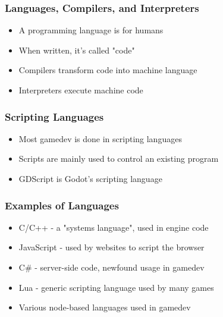 \documentclass{beamer}
\newenvironment{xframe}[2][]
{
    \begin{frame}[fragile,environment=xframe,#1]
    \frametitle{#2}
}{
    \end{frame}
}
\begin{document}
\begin{xframe}{Languages, Compilers, and Interpreters}
    \begin{itemize}
        \item A programming language is for humans
        \item When written, it's called "code"
        \item Compilers transform code into machine language
        \item Interpreters execute machine code
    \end{itemize}

\end{xframe}

\begin{xframe}{Scripting Languages}
    \begin{itemize}
        \item Most gamedev is done in scripting languages
        \item Scripts are mainly used to control an existing program
        \item GDScript is Godot's scripting language
    \end{itemize}

\end{xframe}

\begin{xframe}{Examples of Languages}
    \begin{itemize}
        \item<1-> C/C++ - a "systems language", used in engine code
        \item<2-> JavaScript - used by websites to script the browser
        \item<3-> C\# - server-side code, newfound usage in gamedev
        \item<4-> Lua - generic scripting language used by many games
        \item<5-> Various node-based languages used in gamedev
    \end{itemize}

\end{xframe}
\end{document}
